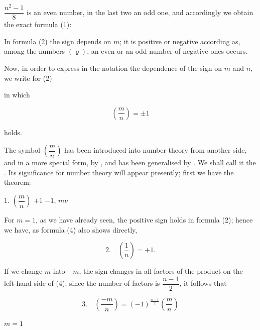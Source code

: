 $\dfrac{n^2-1}{8}$ is an even number, in the last two an odd one,
and accordingly we obtain the exact formula (1):


In formula (2) the sign depends on $m$; it is positive or
negative according as, among the numbers $(\varrho)$, an even or an
odd number of negative ones occurs.

Now, in order to express in the notation the dependence of
the sign on $m$ and $n$, we write for (2)


in which

\[
\left(\frac{m}{n}\right) = \pm 1
\]

holds.

The symbol $\left(\dfrac{m}{n}\right)$ has been introduced into number theory
from another side, and in a more special form, by ,
and has been generalised by . We shall
call it the . Its significance for
number theory will appear presently; first we have
the theorem:

1.  $\left(\dfrac{m}{n}\right)$  $+1$  $-1$,
 $m\nu$ 

For $m = 1$, as we have already seen, the positive sign
holds in formula (2); hence we have, as formula
(4) also shows directly,

\[
2.\quad \left(\frac{1}{n}\right) = +1.
\]

If we change $m$ into $-m$, the sign changes in all factors
of the product on the left-hand side of (4); since
the number of factors is $\dfrac{n-1}{2}$, it follows that

\[
3.\quad \left(\frac{-m}{n}\right) = (-1)^{\frac{n-1}{2}} \left(\frac{m}{n}\right)
\]

 $m = 1$

